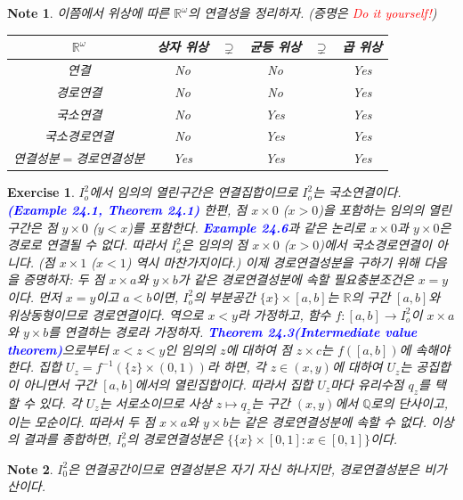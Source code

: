 \documentclass{article}
\newtheorem{exercise}{Exercise}[section]
\newtheorem*{note}{Note}
\newcommand{\Q}{\mathbb{Q}}
\newcommand{\R}{\mathbb{R}}
\begin{document}
\begin{note}
    이쯤에서 위상에 따른 $\R^\omega$의  연결성을 정리하자. (증명은 \textcolor{red}{Do it yourself!})
    \begin{table}[H]
    	\centering
        \begin{tabular}{c|ccccc}
            \toprule
            $\R^\omega$ & 상자 위상 & $\supsetneq$ & 균등 위상 & $\supsetneq$ & 곱 위상 \\
            \midrule
            연결 & No && No && Yes \\
            \midrule
            경로연결 & No && No && Yes  \\
            \midrule
            국소연결 & No && Yes && Yes  \\
            \midrule
            국소경로연결 & No && Yes  && Yes  \\
            \midrule
            연결성분$=$경로연결성분 & Yes && Yes  && Yes \\
            \midrule
        \end{tabular}
    \end{table}
\end{note}

\begin{exercise}
    $I_o^2$에서 임의의 열린구간은 연결집합이므로 $I_o^2$는 국소연결이다. \textcolor{blue}{\textbf{(Example 24.1, Theorem 24.1)}} 한편, 점 $x\times 0$ ($x>0$)을 포함하는 임의의 열린구간은 점 $y\times 0$ ($y<x$)를 포함한다. \textcolor{blue}{\textbf{Example 24.6}}과 같은 논리로 $x\times 0$과 $y\times 0$은 경로로 연결될 수 없다. 따라서 $I_o^2$은 임의의 점 $x\times 0$ ($x>0$)에서 국소경로연결이 아니다. (점 $x\times 1$ ($x<1$) 역시 마찬가지이다.) 이제 경로연결성분을 구하기 위해 다음을 증명하자: 두 점 $x\times a$와 $y\times b$가 같은 경로연결성분에 속할 필요충분조건은 $x=y$이다. 먼저 $x=y$이고 $a<b$이면, $I_o^2$의 부분공간 $\{x\}\times[a,b]$는 $\R$의 구간 $[a,b]$와 위상동형이므로 경로연결이다. 역으로 $x<y$라 가정하고, 함수 $f:[a,b]\to I_o^2$이 $x\times a$와 $y\times b$를 연결하는 경로라 가정하자. \textcolor{blue}{\textbf{Theorem 24.3(Intermediate value theorem)}}으로부터 $x<z<y$인 임의의 $z$에 대하여 점 $z\times c$는 $f([a,b])$에 속해야 한다. 집합 $U_z=f^{-1}(\{z\}\times(0,1))$라 하면, 각 $z\in (x,y)$에 대하여 $U_z$는 공집합이 아니면서 구간 $[a,b]$에서의 열린집합이다. 따라서 집합 $U_z$마다 유리수점 $q_z$를 택할 수 있다. 각 $U_z$는 서로소이므로 사상 $z\mapsto q_z$는 구간 $(x,y)$에서 $\Q$로의 단사이고, 이는 모순이다. 따라서 두 점 $x\times a$와 $y\times b$는 같은 경로연결성분에 속할 수 없다. 이상의 결과를 종합하면, $I_o^2$의 경로연결성분은 $\{\{x\}\times[0,1]:x\in[0,1]\}$이다.
\end{exercise}
\begin{note}
    $I_0^2$은 연결공간이므로 연결성분은 자기 자신 하나지만, 경로연결성분은 비가산이다.
\end{note}
\end{document}
